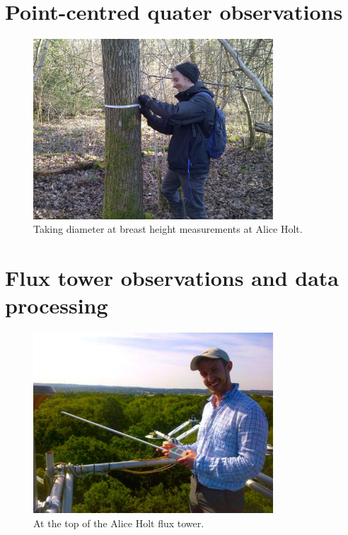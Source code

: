 \documentclass[11pt]{article}
\begin{document}
\section{Point-centred quater observations}

\begin{figure}[ht]
    \centering
    \includegraphics[width=0.8\textwidth]{dbh_me.pdf}
    \caption{Taking diameter at breast height measurements at Alice Holt.} \label{fig:dbh_me}
\end{figure}

\section{Flux tower observations and data processing}

\begin{figure}[ht]
    \centering
    \includegraphics[width=0.8\textwidth]{top_of_flux.pdf}
    \caption{At the top of the Alice Holt flux tower.} \label{fig:flux_me}
\end{figure}

{}
\end{document}
